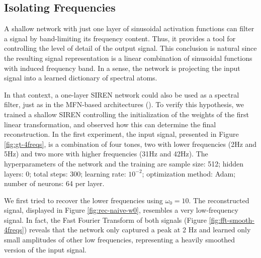\subsection{Isolating Frequencies}

A shallow network with just one layer of sinusoidal activation functions can filter a signal by band-limiting its frequency content. Thus, it provides a tool for controlling the level of detail of the output signal. This conclusion is natural since the resulting signal representation is a linear combination of sinusoidal functions with induced frequency band. In a sense, the network is projecting the input signal into a learned dictionary of spectral atoms.

In that context, a one-layer SIREN network could also be used as a spectral filter, just as in the MFN-based architectures (\cite{fathony2020multiplicative}). To verify this hypothesis, we trained a shallow SIREN controlling the initialization of the weights of the first linear transformation, and observed how this can determine the final reconstruction. In the first experiment, the input signal, presented in Figure \ref{fig:gt-4freqs}, is a combination of four tones, two with lower frequencies (2Hz and 5Hz) and two more with higher frequencies (31Hz and 42Hz). The hyperparameters of the network and the training are sample size: 512; hidden layers: 0; total steps: 300; learning rate: $10^{-2}$; optimization method: Adam; number of neurons: 64 per layer. 

We first tried to recover the lower frequencies using $\omega_0=10$. The reconstructed signal, displayed in Figure \ref{fig:rec-naive-w0}, resembles a very low-frequency signal. In fact, the Fast Fourier Transform of both signals (Figure \ref{fig:fft-smooth-4freqs}) reveals that the network only captured a peak at 2 Hz and learned only small amplitudes of other low frequencies, representing a heavily smoothed version of the input signal.


